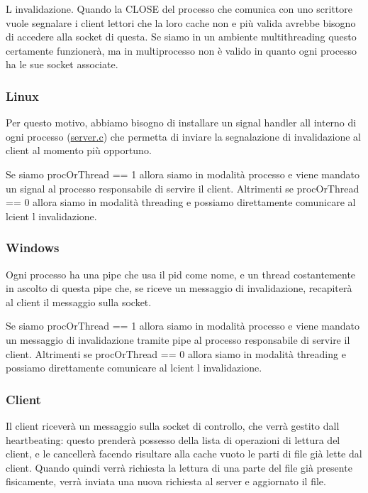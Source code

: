 L\textquotesingle{} invalidazione. Quando la C\+L\+O\+SE del processo che comunica con uno scrittore vuole segnalare i client lettori che la loro cache non e\textquotesingle{} più valida avrebbe bisogno di accedere alla socket di questa. Se siamo in un ambiente multithreading questo certamente funzionerà, ma in multiprocesso non è valido in quanto ogni processo ha le sue socket associate.

\subsubsection*{Linux}

Per questo motivo, abbiamo bisogno di installare un signal handler all\textquotesingle{} interno di ogni processo (\hyperlink{server_8c}{server.\+c}) che permetta di inviare la segnalazione di invalidazione al client al momento più opportuno.

Se siamo proc\+Or\+Thread == 1 allora siamo in modalità processo e viene mandato un signal al processo responsabile di servire il client. Altrimenti se proc\+Or\+Thread == 0 allora siamo in modalità threading e possiamo direttamente comunicare al lcient l\textquotesingle{} invalidazione.

\subsubsection*{Windows}

Ogni processo ha una pipe che usa il pid come nome, e un thread costantemente in ascolto di questa pipe che, se riceve un messaggio di invalidazione, recapiterà al client il messaggio sulla socket.

Se siamo proc\+Or\+Thread == 1 allora siamo in modalità processo e viene mandato un messaggio di invalidazione tramite pipe al processo responsabile di servire il client. Altrimenti se proc\+Or\+Thread == 0 allora siamo in modalità threading e possiamo direttamente comunicare al lcient l\textquotesingle{} invalidazione.

\subsubsection*{Client}

Il client riceverà un messaggio sulla socket di controllo, che verrà gestito dall\textquotesingle{} heartbeating\+: questo prenderà possesso della lista di operazioni di lettura del client, e le cancellerà facendo risultare alla cache vuoto le parti di file già lette dal client. Quando quindi verrà richiesta la lettura di una parte del file già presente fisicamente, verrà inviata una nuova richiesta al server e aggiornato il file. 